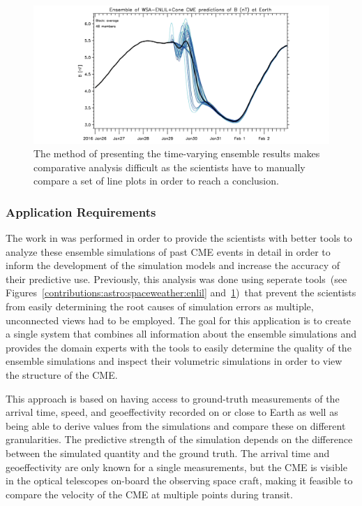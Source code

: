 \begin{figure}
\includegraphics[width=\textwidth]{figures/contributions/spaceweather/ensemble.png}
\caption{The method of presenting the time-varying ensemble results makes comparative analysis difficult as the scientists have to manually compare a set of line plots in order to reach a conclusion.}
\label{contributions:astro:spaceweather:ensemble}
\end{figure}


\subsubsection{Application Requirements} \label{contributions:astro:spaceweather:requirements}
The work in  was performed in order to provide the scientists with better tools to analyze these ensemble simulations of past CME events in detail in order to inform the development of the simulation models and increase the accuracy of their predictive use.  Previously, this analysis was done using seperate tools~(see Figures~\ref{contributions:astro:spaceweather:enlil} and~\ref{contributions:astro:spaceweather:ensemble})~that prevent the scientists from easily determining the root causes of simulation errors as multiple, unconnected views had to be employed.  The goal for this application is to create a single system that combines all information about the ensemble simulations and provides the domain experts with the tools to easily determine the quality of the ensemble simulations and inspect their volumetric simulations in order to view the  structure of the CME.

This approach is based on having access to ground-truth measurements of the arrival time, speed, and geoeffectivity recorded on or close to Earth as well as being able to derive values from the simulations and compare these on different granularities.  The predictive strength of the simulation depends on the difference between the simulated quantity and the ground truth.  The arrival time and geoeffectivity are only known for a single measurements, but the CME is visible in the optical telescopes on-board the observing space craft, making it feasible to compare the velocity of the CME at multiple points during transit.

